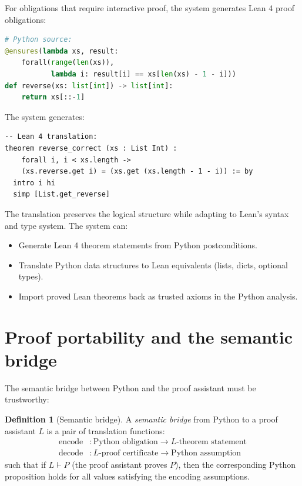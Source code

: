 \documentclass[11pt]{report}
\theoremstyle{definition}
\newtheorem{definition}{Definition}[section]
\theoremstyle{plain}
\begin{document}
For obligations that require interactive proof, the system generates Lean 4
proof obligations:

\begin{lstlisting}[style=deppy,language=Python]
# Python source:
@ensures(lambda xs, result:
    forall(range(len(xs)),
           lambda i: result[i] == xs[len(xs) - 1 - i]))
def reverse(xs: list[int]) -> list[int]:
    return xs[::-1]
\end{lstlisting}

The system generates:
\begin{lstlisting}[language={}]
-- Lean 4 translation:
theorem reverse_correct (xs : List Int) :
    forall i, i < xs.length ->
    (xs.reverse.get i) = (xs.get (xs.length - 1 - i)) := by
  intro i hi
  simp [List.get_reverse]
\end{lstlisting}

The translation preserves the logical structure while adapting to Lean's
syntax and type system. The system can:
\begin{itemize}[nosep]
  \item Generate Lean 4 theorem statements from Python postconditions.
  \item Translate Python data structures to Lean equivalents (lists, dicts,
        optional types).
  \item Import proved Lean theorems back as trusted axioms in the Python
        analysis.
\end{itemize}

\section{Proof portability and the semantic bridge}

The semantic bridge between Python and the proof assistant must be
trustworthy:

\begin{definition}[Semantic bridge]
A \emph{semantic bridge} from Python to a proof assistant $L$ is a pair
of translation functions:
\begin{align*}
  \mathrm{encode} &: \text{Python obligation} \to L\text{-theorem statement} \\
  \mathrm{decode} &: L\text{-proof certificate} \to \text{Python assumption}
\end{align*}
such that if $L \vdash P$ (the proof assistant proves $P$), then the
corresponding Python proposition holds for all values satisfying the
encoding assumptions.
\end{definition}
\end{document}
